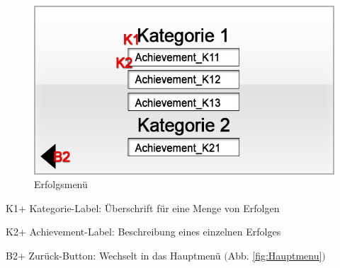


\begin{figure}[H]
\centering
\includegraphics[scale=0.55]{../gui/_jpeg_numeration/achievements.jpg}
\caption{Erfolgsmenü}
\label{fig:Erfolgsmenu}
\end{figure}
\begin{description*}
\item[K1+] Kategorie-Label: Überschrift für eine Menge von Erfolgen
\item[K2+] Achievement-Label: Beschreibung eines einzelnen Erfolges
\item[B2+] Zurück-Button: Wechselt in das Hauptmenü $($Abb. \ref{fig:Hauptmenu}$)$
\end{description*}


